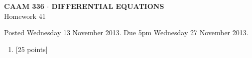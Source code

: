 \documentclass[10pt]{article}
\begin{document}
\vspace*{-5em}
\begin{center}
\large \textsf{\textbf{CAAM 336 $\cdot$ DIFFERENTIAL EQUATIONS}\\[0.5em]
Homework 41 }
\end{center}

Posted Wednesday 13 November 2013.  Due 5pm Wednesday 27 November 2013.

\begin{enumerate}\addtocounter{enumi}{40}
\item {[25 points]}  
\end{enumerate}
\end{document}
